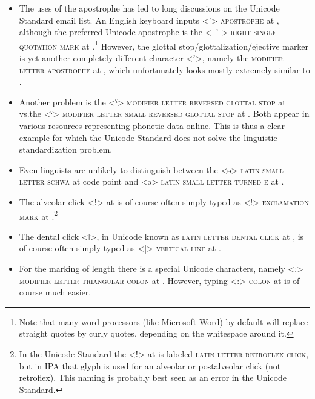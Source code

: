 \begin{itemize}

   \item The uses of the apostrophe has led to long discussions on the Unicode
        Standard email list. An English keyboard inputs <{'}>
        \textsc{apostrophe} at , although the preferred Unicode
        apostrophe is the <\ ' > \textsc{right single quotation mark} at
        .\footnote{Note that many word processors (like Microsoft
        Word) by default will replace straight quotes by curly quotes,
        depending on the whitespace around it.} However, the glottal
        stop/glottalization/ejective marker is yet another completely different
        character <{\large ʼ}>, namely the \textsc{modifier letter apostrophe} at
        , which unfortunately looks mostly extremely similar to
        . 
  \item Another problem is the <ˁ> \textsc{modifier letter reversed glottal
        stop} at  vs.\@ the <ˤ> \textsc{modifier letter small reversed
        glottal stop} at . Both appear in various resources
        representing phonetic data online. This is thus a clear example for
        which the Unicode Standard does not solve the linguistic standardization
        problem.
  \item Even linguists are unlikely to distinguish between the <ə>
        \textsc{latin small letter schwa} at code point  and <ǝ>
        \textsc{latin small letter turned e} at .
  \item The alveolar click <ǃ> at  is of course often simply
        typed as <!> \textsc{exclamation mark} at .\footnote{In the
        Unicode Standard the <ǃ> at  is labeled \textsc{latin letter
        retroflex click}, but in IPA that glyph is used for an alveolar or
        postalveolar click (not retroflex). This naming is probably best seen as
        an error in the Unicode Standard.}
  \item The dental click <ǀ>, in Unicode known as \textsc{latin letter dental
        click} at , is of course often simply typed as <|>
        \textsc{vertical line} at .
  \item For the marking of length there is a special Unicode characters, namely
        <ː> \textsc{modifier letter triangular colon} at . However,
        typing <:> \textsc{colon} at  is of course much easier.        
  
\end{itemize} 


